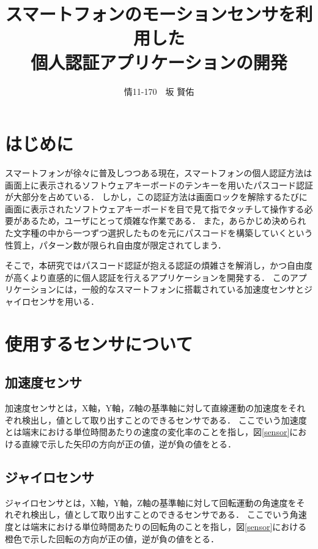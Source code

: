 \documentclass[12pt]{jreport}
\title{\bfseries スマートフォンのモーションセンサを利用した\\個人認証アプリケーションの開発}
\author{情11-170　\UTF{9AD9}坂 賢佑}
\date{}
\begin{document}
\maketitle

\tableofcontents
\listoffigures

\chapter*{はじめに}
スマートフォンが徐々に普及しつつある現在，スマートフォンの個人認証方法は画面上に表示されるソフトウェアキーボードのテンキーを用いたパスコード認証が大部分を占めている．
しかし，この認証方法は画面ロックを解除するたびに画面に表示されたソフトウェアキーボードを目で見て指でタッチして操作する必要があるため，ユーザにとって煩雑な作業である．
また，あらかじめ決められた文字種の中から一つずつ選択したものを元にパスコードを構築していくという性質上，パターン数が限られ自由度が限定されてしまう．

そこで，本研究ではパスコード認証が抱える認証の煩雑さを解消し，かつ自由度が高くより直感的に個人認証を行えるアプリケーションを開発する．
このアプリケーションには，一般的なスマートフォンに搭載されている加速度センサとジャイロセンサを用いる．

\chapter{使用するセンサについて}

    \section{加速度センサ}
    加速度センサとは，X軸，Y軸，Z軸の基準軸に対して直線運動の加速度をそれぞれ検出し，値として取り出すことのできるセンサである．
    ここでいう加速度とは端末における単位時間あたりの速度の変化率のことを指し，図\ref{sensor}における直線で示した矢印の方向が正の値，逆が負の値をとる．

    \section{ジャイロセンサ}
    ジャイロセンサとは，X軸，Y軸，Z軸の基準軸に対して回転運動の角速度をそれぞれ検出し，値として取り出すことのできるセンサである．
    ここでいう角速度とは端末における単位時間あたりの回転角のことを指し，図\ref{sensor}における橙色で示した回転の方向が正の値，逆が負の値をとる．
\end{document}
